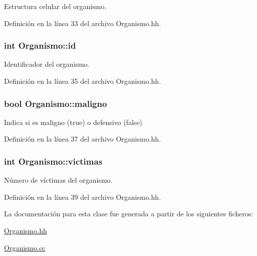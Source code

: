 \-Estructura celular del organismo. 



\-Definición en la línea 33 del archivo \-Organismo.\-hh.

\hypertarget{class_organismo_a30be1823d3711fec651a5a4b1dc1cee5}{
\subsubsection[{id}]{\setlength{\rightskip}{0pt plus 5cm}int {\bf \-Organismo\-::id}}}\label{class_organismo_a30be1823d3711fec651a5a4b1dc1cee5}


\-Identificador del organismo. 



\-Definición en la línea 35 del archivo \-Organismo.\-hh.

\hypertarget{class_organismo_a85a5d1b9d31fa209d1ed0d596dbbed61}{
\subsubsection[{maligno}]{\setlength{\rightskip}{0pt plus 5cm}bool {\bf \-Organismo\-::maligno}}}\label{class_organismo_a85a5d1b9d31fa209d1ed0d596dbbed61}


\-Indica si es maligno (true) o defensivo (false) 



\-Definición en la línea 37 del archivo \-Organismo.\-hh.

\hypertarget{class_organismo_abb3e56487a080df544a6ff96e5e42520}{
\subsubsection[{victimas}]{\setlength{\rightskip}{0pt plus 5cm}int {\bf \-Organismo\-::victimas}}}\label{class_organismo_abb3e56487a080df544a6ff96e5e42520}


\-Número de víctimas del organismo. 



\-Definición en la línea 39 del archivo \-Organismo.\-hh.



\-La documentación para esta clase fue generada a partir de los siguientes ficheros\-:\begin{DoxyCompactItemize}
\item 
\hyperlink{_organismo_8hh}{\-Organismo.\-hh}\item 
\hyperlink{_organismo_8cc}{\-Organismo.\-cc}\end{DoxyCompactItemize}
